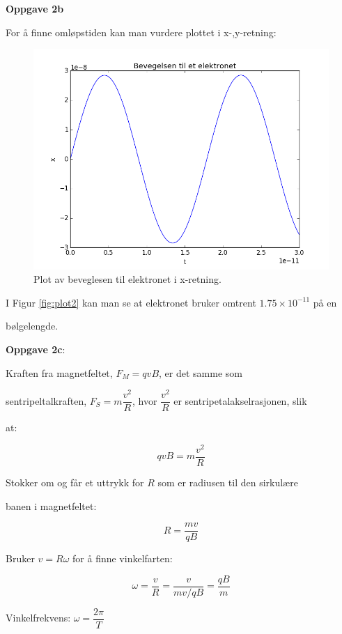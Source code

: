 \documentclass[a4paper,norsk,12pt]{article}
\begin{document}
\textbf{Oppgave 2b}

For å finne omløpstiden kan man vurdere plottet i x-,y-retning:

\begin{figure}[H]
  \includegraphics[width=\linewidth]{oppgave24.png}
  \caption{Plot av beveglesen til elektronet i x-retning.}
  \label{fig:plot4}
\end{figure}

I Figur \ref{fig:plot2} kan man se at elektronet bruker omtrent $ 1.75 \times 10^{-11}$ på en 

bølgelengde. 

\hspace{1cm}

\textbf{Oppgave 2c}:

Kraften fra magnetfeltet, $F_M = q v B$, er det samme som 

sentripeltalkraften, $F_S = m \dfrac{v^2}{R}$, hvor $\dfrac{v^2}{R}$ er sentripetalakselrasjonen, slik 

at:

$$ q v B = m \dfrac{v^2}{R} $$ 

Stokker om og får et uttrykk for $R$ som er radiusen til den sirkulære 

banen i magnetfeltet:

$$ R = \dfrac{m v}{q B} $$ 

Bruker $ v = R \omega $ for å finne vinkelfarten:

$$ \omega =  \dfrac{v}{R} =  \dfrac{v}{{m v}/{q B}} =\dfrac{q B}{m} $$

Vinkelfrekvens: $\omega = \dfrac{2 \pi}{T}$
\end{document}
